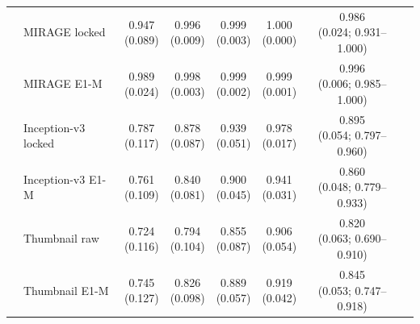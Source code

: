 \begin{longtable}{@{}llcccccp{3cm}@{}}
 & MIRAGE locked & \makecell{0.947\\{\scriptsize (0.089)}} & \makecell{0.996\\{\scriptsize (0.009)}} & \makecell{0.999\\{\scriptsize (0.003)}} & \makecell{1.000\\{\scriptsize (0.000)}} & \makecell{0.986\\{\scriptsize (0.024; 0.931--1.000)}} &  \\
 & MIRAGE E1-M & \makecell{0.989\\{\scriptsize (0.024)}} & \makecell{0.998\\{\scriptsize (0.003)}} & \makecell{0.999\\{\scriptsize (0.002)}} & \makecell{0.999\\{\scriptsize (0.001)}} & \makecell{0.996\\{\scriptsize (0.006; 0.985--1.000)}} &  \\
 & Inception-v3 locked & \makecell{0.787\\{\scriptsize (0.117)}} & \makecell{0.878\\{\scriptsize (0.087)}} & \makecell{0.939\\{\scriptsize (0.051)}} & \makecell{0.978\\{\scriptsize (0.017)}} & \makecell{0.895\\{\scriptsize (0.054; 0.797--0.960)}} &  \\
 & Inception-v3 E1-M & \makecell{0.761\\{\scriptsize (0.109)}} & \makecell{0.840\\{\scriptsize (0.081)}} & \makecell{0.900\\{\scriptsize (0.045)}} & \makecell{0.941\\{\scriptsize (0.031)}} & \makecell{0.860\\{\scriptsize (0.048; 0.779--0.933)}} &  \\
 & Thumbnail raw & \makecell{0.724\\{\scriptsize (0.116)}} & \makecell{0.794\\{\scriptsize (0.104)}} & \makecell{0.855\\{\scriptsize (0.087)}} & \makecell{0.906\\{\scriptsize (0.054)}} & \makecell{0.820\\{\scriptsize (0.063; 0.690--0.910)}} &  \\
 & Thumbnail E1-M & \makecell{0.745\\{\scriptsize (0.127)}} & \makecell{0.826\\{\scriptsize (0.098)}} & \makecell{0.889\\{\scriptsize (0.057)}} & \makecell{0.919\\{\scriptsize (0.042)}} & \makecell{0.845\\{\scriptsize (0.053; 0.747--0.918)}} &  \\

\end{longtable}
